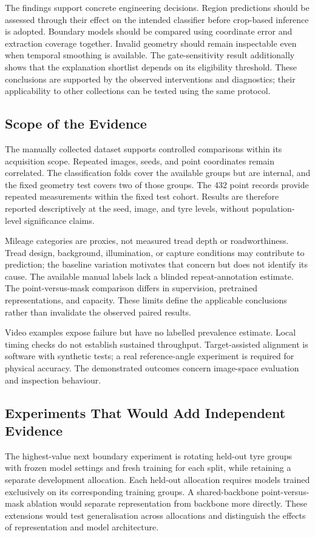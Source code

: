 The findings support concrete engineering decisions. Region predictions should be assessed through their effect on the intended classifier before crop-based inference is adopted. Boundary models should be compared using coordinate error and extraction coverage together. Invalid geometry should remain inspectable even when temporal smoothing is available. The gate-sensitivity result additionally shows that the explanation shortlist depends on its eligibility threshold. These conclusions are supported by the observed interventions and diagnostics; their applicability to other collections can be tested using the same protocol.

\subsection{Scope of the Evidence}
The manually collected dataset supports controlled comparisons within its acquisition scope. Repeated images, seeds, and point coordinates remain correlated. The classification folds cover the available groups but are internal, and the fixed geometry test covers two of those groups. The 432 point records provide repeated measurements within the fixed test cohort. Results are therefore reported descriptively at the seed, image, and tyre levels, without population-level significance claims.

Mileage categories are proxies, not measured tread depth or roadworthiness. Tread design, background, illumination, or capture conditions may contribute to prediction; the baseline variation motivates that concern but does not identify its cause. The available manual labels lack a blinded repeat-annotation estimate. The point-versus-mask comparison differs in supervision, pretrained representations, and capacity. These limits define the applicable conclusions rather than invalidate the observed paired results.

Video examples expose failure but have no labelled prevalence estimate. Local timing checks do not establish sustained throughput. Target-assisted alignment is software with synthetic tests; a real reference-angle experiment is required for physical accuracy. The demonstrated outcomes concern image-space evaluation and inspection behaviour.

\subsection{Experiments That Would Add Independent Evidence}
The highest-value next boundary experiment is rotating held-out tyre groups with frozen model settings and fresh training for each split, while retaining a separate development allocation. Each held-out allocation requires models trained exclusively on its corresponding training groups. A shared-backbone point-versus-mask ablation would separate representation from backbone more directly. These extensions would test generalisation across allocations and distinguish the effects of representation and model architecture.

